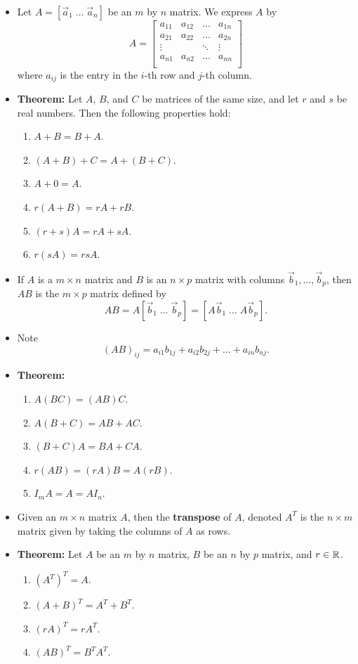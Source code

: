 \begin{itemize}

\item Let $A=[\vec{a}_1 \; \dots \; \vec{a}_n]$ be an $m$ by $n$ matrix. We express $A$ by
$$A=\begin{bmatrix}
a_{11} & a_{12} & \hdots & a_{1n}\\ 
a_{21} & a_{22} & \hdots & a_{2n}\\ 
\vdots & & \ddots & \vdots\\
a_{n1} & a_{n2} & \hdots & a_{nn}\\ 
\end{bmatrix}$$
where $a_{ij}$ is the entry in the $i$-th row and $j$-th column.
\item {\bf Theorem:} Let $A$, $B$, and $C$ be matrices of the same size, and let $r$ and $s$ be real numbers. Then the following properties hold:
\begin{enumerate}
\item $A+B=B+A$.
\item $(A+B)+C=A+(B+C)$.
\item $A+0=A$.
\item $r(A+B)=rA+rB$.
\item $(r+s)A=rA+sA$.
\item $r(sA)=rsA$.
\end{enumerate}
\item If $A$ is a $m\times n$ matrix and $B$ is an $n\times p$ matrix with columns $\vec{b}_1, \dots, \vec{b}_p$, then $AB$ is the $m \times p$ matrix defined by $$AB=A[\vec{b}_1 \; \dots \; \vec{b}_p]=[A\vec{b}_1 \; \dots \; A\vec{b}_p].$$
\item Note $$(AB)_{ij}=a_{i1}b_{1j}+a_{i2}b_{2j}+\dots+a_{in}b_{nj}.$$
\item {\bf Theorem:}
\begin{enumerate}
\item $A(BC)=(AB)C$.
\item $A(B+C)=AB+AC$.
\item $(B+C)A=BA+CA$.
\item $r(AB)=(rA)B=A(rB)$.
\item $I_m A =A = AI_n$.
\end{enumerate}
\item Given an $m\times n$ matrix $A$, then the {\bf transpose} of $A$, denoted $A^{T}$ is the $n \times m$ matrix given by taking the columns of $A$ as rows.
\item {\bf Theorem:} Let $A$ be an $m$ by $n$ matrix, $B$ be an $n$ by $p$ matrix, and $r\in \mathbb{R}$.
\begin{enumerate}
\item $(A^{T})^{T}=A.$
\item $(A+B)^{T}=A^{T}+B^{T}.$
\item $(rA)^{T}=r A^{T}$.
\item $(AB)^{T}=B^{T} A^{T}$.
\end{enumerate}
\end{itemize}

